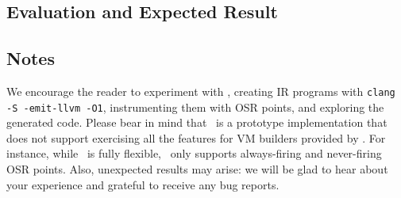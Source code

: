 \subsection{Evaluation and Expected Result}
\label{ss:art-eval-res}



\ifdefined \nomcvm
\else

\fi

\subsection{Notes}

We encourage the reader to experiment with \tinyvm, creating IR programs with {\tt clang -S -emit-llvm -O1}, instrumenting them with OSR points, and exploring the generated code. Please bear in mind that \tinyvm\ is a prototype implementation that does not support exercising all the features for VM builders provided by \osrkit. For instance, while \osrkit\ is fully flexible, \tinyvm\ only supports always-firing and never-firing OSR points. Also, unexpected results may arise: we will be glad to hear about your experience and grateful to receive any bug reports.




